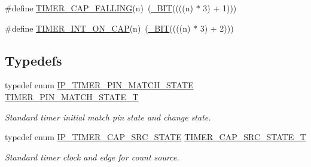 \begin{DoxyCompactItemize}
\item 
\#define \hyperlink{group___t_i_m_e_r__18_x_x__43_x_x_gad35ff35bf622cb530f2206ecdd861a7d}{T\+I\+M\+E\+R\+\_\+\+C\+A\+P\+\_\+\+F\+A\+L\+L\+I\+NG}(n)~(\hyperlink{group___l_p_c___types___public___macros_ga7ee022f5e5a971a8324e4b7572d49170}{\+\_\+\+B\+IT}((((n) $\ast$ 3) + 1)))
\item 
\#define \hyperlink{group___t_i_m_e_r__18_x_x__43_x_x_ga39a441a62cb174fd89ebc217417482c9}{T\+I\+M\+E\+R\+\_\+\+I\+N\+T\+\_\+\+O\+N\+\_\+\+C\+AP}(n)~(\hyperlink{group___l_p_c___types___public___macros_ga7ee022f5e5a971a8324e4b7572d49170}{\+\_\+\+B\+IT}((((n) $\ast$ 3) + 2)))
\end{DoxyCompactItemize}
\subsection*{Typedefs}
\begin{DoxyCompactItemize}
\item 
typedef enum \hyperlink{group___t_i_m_e_r__18_x_x__43_x_x_ga29caa12f43ff996d3ebbf7d5f9036f2c}{I\+P\+\_\+\+T\+I\+M\+E\+R\+\_\+\+P\+I\+N\+\_\+\+M\+A\+T\+C\+H\+\_\+\+S\+T\+A\+TE} \hyperlink{group___t_i_m_e_r__18_x_x__43_x_x_ga15be0f559655d587ad466689f639ab72}{T\+I\+M\+E\+R\+\_\+\+P\+I\+N\+\_\+\+M\+A\+T\+C\+H\+\_\+\+S\+T\+A\+T\+E\+\_\+T}
\begin{DoxyCompactList}\small\item\em Standard timer initial match pin state and change state. \end{DoxyCompactList}\item 
typedef enum \hyperlink{group___t_i_m_e_r__18_x_x__43_x_x_ga1ceafbd6fb46418e292878934efb63aa}{I\+P\+\_\+\+T\+I\+M\+E\+R\+\_\+\+C\+A\+P\+\_\+\+S\+R\+C\+\_\+\+S\+T\+A\+TE} \hyperlink{group___t_i_m_e_r__18_x_x__43_x_x_ga3f9e5a3ea9ebb982339b786ff7946408}{T\+I\+M\+E\+R\+\_\+\+C\+A\+P\+\_\+\+S\+R\+C\+\_\+\+S\+T\+A\+T\+E\+\_\+T}
\begin{DoxyCompactList}\small\item\em Standard timer clock and edge for count source. \end{DoxyCompactList}\end{DoxyCompactItemize}
